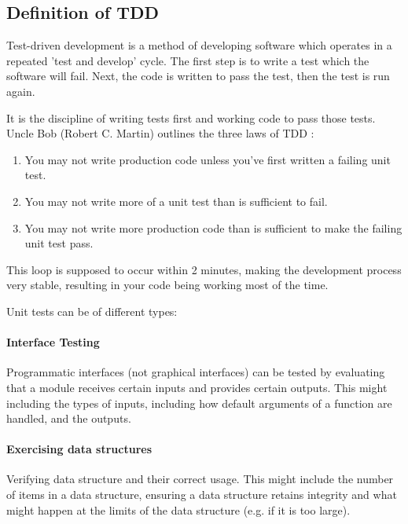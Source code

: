 \subsection{Definition of TDD}
Test-driven development is a method of developing software which operates in a repeated 'test and develop' cycle. The first step is to write a test which the software will fail. Next, the code is written to pass the test, then the test is run again.

It is the discipline of writing tests first and working code to pass those tests. Uncle Bob (Robert C. Martin) outlines the three laws of TDD \cite{4163026}:

\begin{enumerate}
	\item You may not write production code unless you’ve first written a failing unit test.
	\item You may not write more of a unit test than is sufficient to fail.
	\item You may not write more production code than is sufficient to make the failing unit test pass.
\end{enumerate}

This loop is supposed to occur within 2 minutes, making the development process very stable, resulting in your code being working most of the time.

Unit tests can be of different types:

\paragraph{Interface Testing} %
\label{par:interface_testing}
Programmatic interfaces (not graphical interfaces) can be tested by evaluating that a module receives certain inputs and provides certain outputs. This might including the types of inputs, including how default arguments of a function are handled, and the outputs.

\paragraph{Exercising data structures} %
\label{par:exercising_data_structures}
Verifying data structure and their correct usage. This might include the number of items in a data structure, ensuring a data structure retains integrity and what might happen at the limits of the data structure (e.g. if it is too large).


